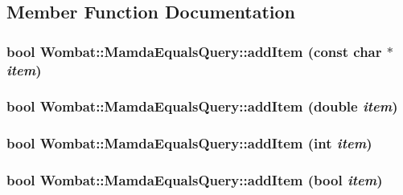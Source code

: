 \subsection{Member Function Documentation}
\hypertarget{classWombat_1_1MamdaEqualsQuery_9424d8cf0d5cb3e5639956249c3bbdb9}{
\subsubsection[addItem]{\setlength{\rightskip}{0pt plus 5cm}bool Wombat::Mamda\-Equals\-Query::add\-Item (const char $\ast$ {\em item})}}
\label{classWombat_1_1MamdaEqualsQuery_9424d8cf0d5cb3e5639956249c3bbdb9}


\hypertarget{classWombat_1_1MamdaEqualsQuery_0ca3da96ca797709543b3d1045e474b0}{
\subsubsection[addItem]{\setlength{\rightskip}{0pt plus 5cm}bool Wombat::Mamda\-Equals\-Query::add\-Item (double {\em item})}}
\label{classWombat_1_1MamdaEqualsQuery_0ca3da96ca797709543b3d1045e474b0}


\hypertarget{classWombat_1_1MamdaEqualsQuery_d10dba4c193e0a36ba3088a88ba6279f}{
\subsubsection[addItem]{\setlength{\rightskip}{0pt plus 5cm}bool Wombat::Mamda\-Equals\-Query::add\-Item (int {\em item})}}
\label{classWombat_1_1MamdaEqualsQuery_d10dba4c193e0a36ba3088a88ba6279f}


\hypertarget{classWombat_1_1MamdaEqualsQuery_b90c6e8eb5d821cd9ae60e33f1917739}{
\subsubsection[addItem]{\setlength{\rightskip}{0pt plus 5cm}bool Wombat::Mamda\-Equals\-Query::add\-Item (bool {\em item})}}
\label{classWombat_1_1MamdaEqualsQuery_b90c6e8eb5d821cd9ae60e33f1917739}


